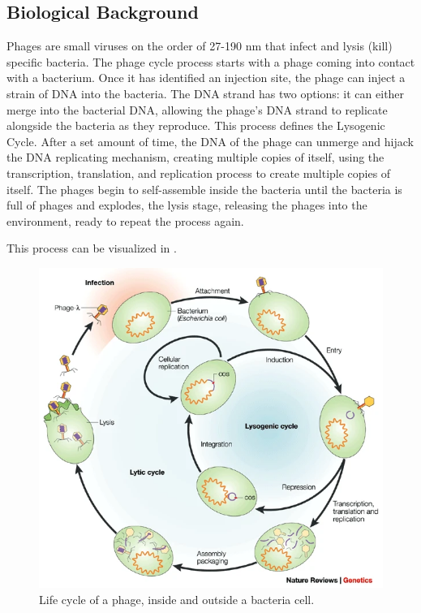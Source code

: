 \subsection{Biological Background}
Phages are small viruses on the order of 27-190 nm that infect and lysis (kill) specific bacteria.
The phage cycle process starts with a phage coming into contact with a bacterium.
Once it has identified an injection site, the phage can inject a strain of DNA into the bacteria.
The DNA strand has two options: it can either merge into the bacterial DNA, allowing the phage's DNA strand to replicate alongside the bacteria as they reproduce.
This process defines the Lysogenic Cycle.
After a set amount of time, the DNA of the phage can unmerge and hijack the DNA replicating mechanism, creating multiple copies of itself, using the transcription, translation, and replication process to create multiple copies of itself.
The phages begin to self-assemble inside the bacteria until the bacteria is full of phages and explodes, the lysis stage, releasing the phages into the environment, ready to repeat the process again. 

This process can be visualized in  \cite{campbellFutureBacteriophageBiology2003}.
\begin{figure}
    \centering
    \includegraphics[width=0.5\linewidth]{Chapters/Figures/phage_life_cycle.png}
    \caption{Life cycle of a phage, inside and outside a bacteria cell.}
    \label{fig:phage_life_cycle}
\end{figure}